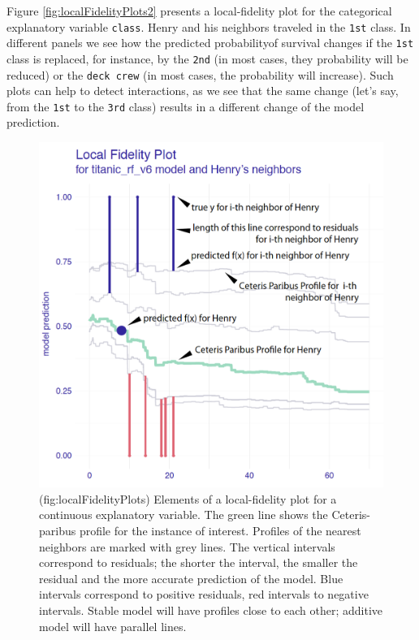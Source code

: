 \documentclass[12pt,]{krantz}
\begin{document}
Figure \ref{fig:localFidelityPlots2} presents a local-fidelity plot for the categorical explanatory variable \texttt{class}. Henry and his neighbors traveled in the \texttt{1st} class. In different panels we see how the predicted probabilityof survival changes if the \texttt{1st} class is replaced, for instance, by the \texttt{2nd} (in most cases, they probability will be reduced) or the \texttt{deck\ crew} (in most cases, the probability will increase). Such plots can help to detect interactions, as we see that the same change (let's say, from the \texttt{1st} to the \texttt{3rd} class) results in a different change of the model prediction.

\begin{figure}

{\centering \includegraphics[width=0.7\linewidth]{figure/localFidelityPlots} 

}

\caption{(fig:localFidelityPlots) Elements of a local-fidelity plot for a continuous explanatory variable. The green line shows the Ceteris-paribus profile for the instance of interest. Profiles of the nearest neighbors are marked with grey lines. The vertical intervals correspond to residuals; the shorter the interval, the smaller the residual and the more accurate prediction of the model. Blue intervals correspond to positive residuals, red intervals to negative intervals. Stable model will have profiles close to each other; additive model will have parallel lines.}\label{fig:localFidelityPlots}
\end{figure}
\end{document}
